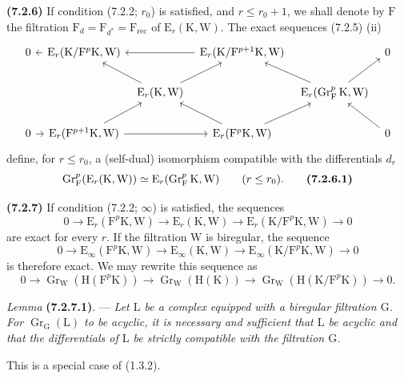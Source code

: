 \documentclass[11pt,leqno]{article}
\begin{document}
\textbf{(7.2.6)} If condition (7.2.2; \(r_0\)) is satisfied, and \(r\leq r_0+1\), we shall denote by \(\mathrm{F}\) the filtration \(\mathrm{F}_d=\mathrm{F}_{d^{*}}=\mathrm{F}_{\mathrm{rec}}\) of \(\mathrm{E}_r(\mathrm{K},\mathrm{W})\). The exact sequences (7.2.5) (ii)
\[
\begin{tikzcd}[column sep=0.6em,row sep=1.8em]
0
& \mathrm{E}_r(\mathrm{K}/\mathrm{F}^p\mathrm{K},\mathrm{W}) \arrow[l]
& & \mathrm{E}_r(\mathrm{K}/\mathrm{F}^{p+1}\mathrm{K},\mathrm{W}) \arrow[ll]
& & 0 \\
& & \mathrm{E}_r(\mathrm{K},\mathrm{W}) \arrow[ul] \arrow[ur]
& & \mathrm{E}_r(\operatorname{Gr}_{\mathrm{F}}^p\mathrm{K},\mathrm{W})
    \arrow[ul] \arrow[ur]
& \\
0 \arrow[r]
& \mathrm{E}_r(\mathrm{F}^{p+1}\mathrm{K},\mathrm{W}) \arrow[ur] \arrow[rr]
& & \mathrm{E}_r(\mathrm{F}^p\mathrm{K},\mathrm{W}) \arrow[ul] \arrow[ur]
& & 0 \arrow[ul]
\end{tikzcd}
\]
define, for \(r\leq r_0\), a (self-dual) isomorphism compatible with the differentials \(d_r\)
\[
\operatorname{Gr}_{\mathrm{F}}^p(\mathrm{E}_r(\mathrm{K},\mathrm{W}))
\simeq\mathrm{E}_r(\operatorname{Gr}_{\mathrm{F}}^p\mathrm{K},\mathrm{W})
\qquad(r\leq r_0).
\tag*{\textbf{(7.2.6.1)}}
\]

\textbf{(7.2.7)} If condition (7.2.2; \(\infty\)) is satisfied, the sequences
\[
0\to\mathrm{E}_r(\mathrm{F}^p\mathrm{K},\mathrm{W})
\to\mathrm{E}_r(\mathrm{K},\mathrm{W})
\to\mathrm{E}_r(\mathrm{K}/\mathrm{F}^p\mathrm{K},\mathrm{W})\to 0
\]
are exact for every \(r\). If the filtration \(\mathrm{W}\) is biregular, the sequence
\[
0\to\mathrm{E}_{\infty}(\mathrm{F}^p\mathrm{K},\mathrm{W})
\to\mathrm{E}_{\infty}(\mathrm{K},\mathrm{W})
\to\mathrm{E}_{\infty}(\mathrm{K}/\mathrm{F}^p\mathrm{K},\mathrm{W})\to 0
\]
is therefore exact. We may rewrite this sequence as
\[
0\to\operatorname{Gr}_{\mathrm{W}}(\mathrm{H}(\mathrm{F}^p\mathrm{K}))
\to\operatorname{Gr}_{\mathrm{W}}(\mathrm{H}(\mathrm{K}))
\to\operatorname{Gr}_{\mathrm{W}}(\mathrm{H}(\mathrm{K}/\mathrm{F}^p\mathrm{K}))
\to 0.
\]

\textit{Lemma} \textbf{(7.2.7.1)}. — \textit{Let \(\mathrm{L}\) be a complex equipped with a biregular filtration \(\mathrm{G}\). For \(\operatorname{Gr}_{\mathrm{G}}(\mathrm{L})\) to be acyclic, it is necessary and sufficient that \(\mathrm{L}\) be acyclic and that the differentials of \(\mathrm{L}\) be strictly compatible with the filtration \(\mathrm{G}\).}

This is a special case of (1.3.2).
\end{document}
